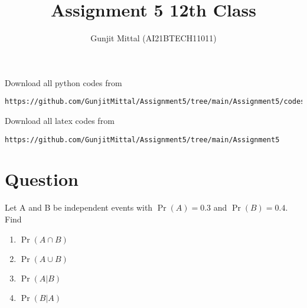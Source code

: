 \documentclass[journal,12pt,twocolumn]{IEEEtran}
\begin{document}
\let\vec\mathbf{}
\def\putbox#1#2#3{\makebox[0in][l]{\makebox[#1][l]{}\raisebox{\baselineskip}[0in][0in]{\raisebox{#2}[0in][0in]{#3}}}}
     \def\rightbox#1{\makebox[0in][r]{#1}}
     \def\centbox#1{\makebox[0in]{#1}}
     \def\topbox#1{\raisebox{-\baselineskip}[0in][0in]{#1}}
     \def\midbox#1{\raisebox{-0.5\baselineskip}[0in][0in]{#1}}
\vspace{3cm}
\title{Assignment 5 12th Class}
\author{Gunjit Mittal (AI21BTECH11011)}
\maketitle
Download all python codes from 
\begin{lstlisting}
https://github.com/GunjitMittal/Assignment5/tree/main/Assignment5/codes
\end{lstlisting}
Download all latex codes from 
\begin{lstlisting}
https://github.com/GunjitMittal/Assignment5/tree/main/Assignment5
\end{lstlisting} 
\section{Question}
Let A and B be independent events with $\Pr(A) = 0.3$ and $\Pr(B) = 0.4$. Find
\begin{enumerate}[label= (\roman{enumi})]
    \item $\Pr(A \cap  B)$ 
    \item $\Pr(A \cup  B)$
    \item $\Pr(A|B)$
    \item $\Pr(B|A)$
\end{enumerate}
\end{document}

